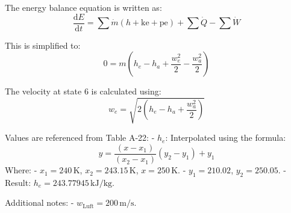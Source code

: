 The energy balance equation is written as:  
\[ \frac{\text{d}E}{\text{d}t} = \sum \dot{m} (h + \text{ke} + \text{pe}) + \sum \dot{Q} - \sum \dot{W} \]  

This is simplified to:  
\[ 0 = m (h_e - h_a + \frac{w_e^2}{2} - \frac{w_a^2}{2}) \]  

The velocity at state 6 is calculated using:  
\[ w_e = \sqrt{2 (h_e - h_a + \frac{w_a^2}{2})} \]  

Values are referenced from Table A-22:  
- \( h_e \): Interpolated using the formula:  
\[ y = \frac{(x - x_1)}{(x_2 - x_1)} (y_2 - y_1) + y_1 \]  
Where:  
  - \( x_1 = 240 \, \text{K} \), \( x_2 = 243.15 \, \text{K} \), \( x = 250 \, \text{K} \).  
  - \( y_1 = 210.02 \), \( y_2 = 250.05 \).  
  - Result: \( h_e = 243.77945 \, \text{kJ/kg} \).  

Additional notes:  
- \( w_{\text{Luft}} = 200 \, \text{m/s} \).